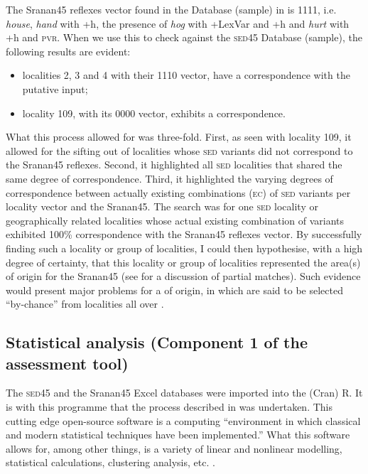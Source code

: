 {{{\newpage 
The Sranan45 reflexes vector found in the  Database (sample) in  is 1111, i.e. \emph{house}, \emph{hand} with +h, the presence of \emph{hog} with +LexVar and +h and \emph{hurt} with +h and \textminus\textsc{pvr}. When we use this to check against the \textsc{sed45} Database (sample), the following results are evident:


\begin{itemize}
\item {localities 2, 3 and 4 with their 1110 vector, have a  correspondence with the putative input;}
\item {locality 109, with its 0000 vector, exhibits a  correspondence.} 
\end{itemize}

What this process allowed for was three-fold. First, as seen with locality 109, it allowed for the sifting out of localities whose \textsc{sed} variants did not correspond to the Sranan45 reflexes. Second, it highlighted all \textsc{sed} localities that shared the same degree of correspondence. Third, it highlighted the varying degrees of correspondence between actually existing combinations (\textsc{ec}) of \textsc{sed} variants per locality vector and the Sranan45. The search was for one \textsc{sed} locality or geographically related localities whose actual existing combination of variants exhibited 100\% correspondence with the Sranan45 reflexes vector. By successfully finding such a locality or group of localities, I could then hypothesise, with a high degree of certainty, that this locality or group of localities represented the area(s) of origin for the Sranan45 (see  for a discussion of partial matches). Such evidence would present major problems for a  of origin, in which  are said to be selected ``by-chance'' from localities all over .

\subsection{Statistical analysis (Component 1 of the assessment tool)} \label{3.4.3}
The \textsc{sed45} and the Sranan45 Excel databases were imported into the  (Cran) R. It is with this programme that the process described in  was undertaken. This cutting edge open-source software is a computing ``environment in which classical and modern statistical techniques have been implemented.'' What this software allows for, among other things, is a variety of linear and nonlinear modelling, statistical calculations, clustering analysis, etc. \citep{R11}.

}}}
